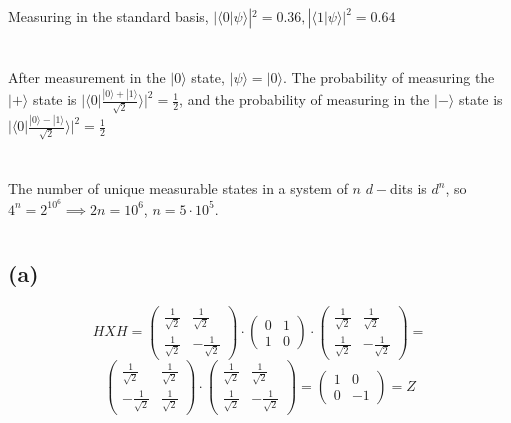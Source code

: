 \documentclass{article}
\begin{document}
\section{}

Measuring in the standard basis, $|\langle 0|\psi\rangle|^2=\boxed{0.36}, |\langle 1|\psi\rangle|^2=\boxed{0.64} $

\section{}

After measurement in the $|0\rangle$ state, $|\psi\rangle=|0\rangle$. The probability of measuring the $|+\rangle$ state is $|\langle 0|\frac{|0\rangle+|1\rangle}{\sqrt{2}}\rangle|^2=\boxed{\frac{1}{2}}$, and the probability of measuring in the $|-\rangle$ state is $|\langle 0|\frac{|0\rangle-|1\rangle}{\sqrt{2}}\rangle|^2=\boxed{\frac{1}{2}}$

\section{}

The number of unique measurable states in a system of $n$ $d-$dits is $d^n$, so $4^n=2^{10^6}\implies 2n=10^6$, $n=\boxed{5\cdot 10^5}$.

\section{}

\subsection*{(a)}

$$HXH=
\begin{pmatrix}
\frac{1}{\sqrt{2}} & \frac{1}{\sqrt{2}} \\
\frac{1}{\sqrt{2}} & -\frac{1}{\sqrt{2}}
\end{pmatrix}\cdot 
\begin{pmatrix}
0 & 1 \\
1 & 0
\end{pmatrix}\cdot
\begin{pmatrix}
\frac{1}{\sqrt{2}} & \frac{1}{\sqrt{2}} \\
\frac{1}{\sqrt{2}} & -\frac{1}{\sqrt{2}}
\end{pmatrix}=
$$
$$
\begin{pmatrix}
\frac{1}{\sqrt{2}} & \frac{1}{\sqrt{2}} \\
-\frac{1}{\sqrt{2}} & \frac{1}{\sqrt{2}}
\end{pmatrix}\cdot
\begin{pmatrix}
\frac{1}{\sqrt{2}} & \frac{1}{\sqrt{2}} \\
\frac{1}{\sqrt{2}} & -\frac{1}{\sqrt{2}}
\end{pmatrix}=
\begin{pmatrix}
1 & 0 \\
0 & -1
\end{pmatrix}=Z
$$
\end{document}
